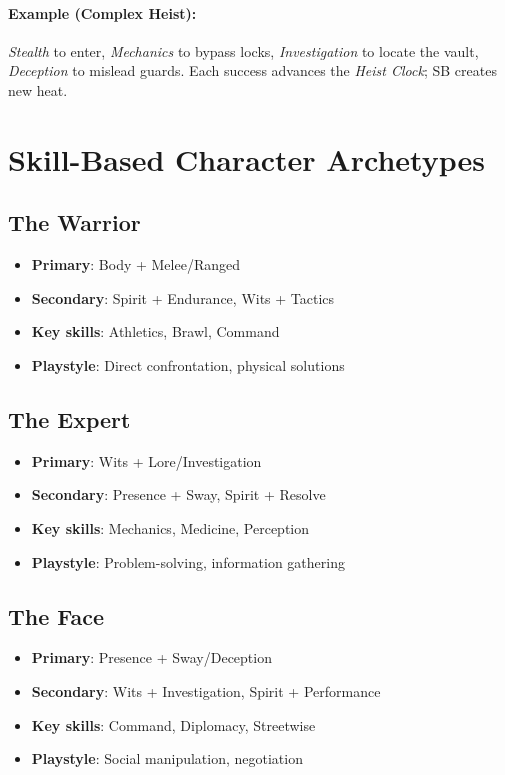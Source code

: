 \paragraph{Example (Complex Heist):}
\emph{Stealth} to enter, \emph{Mechanics} to bypass locks, \emph{Investigation} to locate the vault, \emph{Deception} to mislead guards. Each success advances the \emph{Heist Clock}; SB creates new heat.

\section{Skill-Based Character Archetypes}

\subsection*{The Warrior}
\begin{itemize}
\item \textbf{Primary}: Body + Melee/Ranged
\item \textbf{Secondary}: Spirit + Endurance, Wits + Tactics
\item \textbf{Key skills}: Athletics, Brawl, Command
\item \textbf{Playstyle}: Direct confrontation, physical solutions
\end{itemize}

\subsection*{The Expert}
\begin{itemize}
\item \textbf{Primary}: Wits + Lore/Investigation
\item \textbf{Secondary}: Presence + Sway, Spirit + Resolve
\item \textbf{Key skills}: Mechanics, Medicine, Perception
\item \textbf{Playstyle}: Problem-solving, information gathering
\end{itemize}

\subsection*{The Face}
\begin{itemize}
\item \textbf{Primary}: Presence + Sway/Deception
\item \textbf{Secondary}: Wits + Investigation, Spirit + Performance
\item \textbf{Key skills}: Command, Diplomacy, Streetwise
\item \textbf{Playstyle}: Social manipulation, negotiation
\end{itemize}

